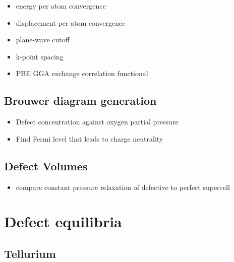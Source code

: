 \begin{itemize}
\item energy per atom convergence
\item displacement per atom convergence
\item plane-wave cutoff
\item k-point spacing
\item PBE GGA exchange correlation functional
\end{itemize}

\subsection{Brouwer diagram generation}

\begin{itemize}
\item Defect concentration against oxygen partial pressure 
\item Find Fermi level that leads to charge neutrality
\end{itemize}

\subsection{Defect Volumes}

\begin{itemize}
\item compare constant pressure relaxation of defective to perfect supercell
\end{itemize}

\section{Defect equilibria}
\subsection{Tellurium}

